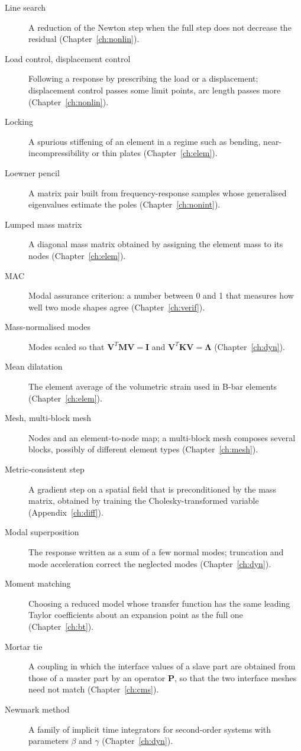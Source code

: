 \begin{description}
\item[Line search] A reduction of the Newton step when the full step does not decrease the residual (Chapter~\ref{ch:nonlin}).
\item[Load control, displacement control] Following a response by prescribing the load or a displacement; displacement control passes some limit points, arc length passes more (Chapter~\ref{ch:nonlin}).
\item[Locking] A spurious stiffening of an element in a regime such as bending, near-incompressibility or thin plates (Chapter~\ref{ch:elem}).
\item[Loewner pencil] A matrix pair built from frequency-response samples whose generalised eigenvalues estimate the poles (Chapter~\ref{ch:nonint}).
\item[Lumped mass matrix] A diagonal mass matrix obtained by assigning the element mass to its nodes (Chapter~\ref{ch:elem}).
\item[MAC] Modal assurance criterion: a number between 0 and 1 that measures how well two mode shapes agree (Chapter~\ref{ch:verif}).
\item[Mass-normalised modes] Modes scaled so that $\bm V^T\bm M\bm V=\bm I$ and $\bm V^T\bm K\bm V=\bm\Lambda$ (Chapter~\ref{ch:dyn}).
\item[Mean dilatation] The element average of the volumetric strain used in B-bar elements (Chapter~\ref{ch:elem}).
\item[Mesh, multi-block mesh] Nodes and an element-to-node map; a multi-block mesh composes several blocks, possibly of different element types (Chapter~\ref{ch:mesh}).
\item[Metric-consistent step] A gradient step on a spatial field that is preconditioned by the mass matrix, obtained by training the Cholesky-transformed variable (Appendix~\ref{ch:diff}).
\item[Modal superposition] The response written as a sum of a few normal modes; truncation and mode acceleration correct the neglected modes (Chapter~\ref{ch:dyn}).
\item[Moment matching] Choosing a reduced model whose transfer function has the same leading Taylor coefficients about an expansion point as the full one (Chapter~\ref{ch:bt}).
\item[Mortar tie] A coupling in which the interface values of a slave part are obtained from those of a master part by an operator $\bm P$, so that the two interface meshes need not match (Chapter~\ref{ch:cms}).
\item[Newmark method] A family of implicit time integrators for second-order systems with parameters $\beta$ and $\gamma$ (Chapter~\ref{ch:dyn}).

\end{description}
